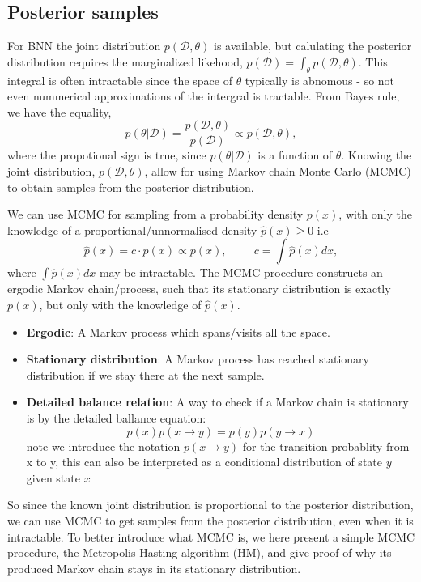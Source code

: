 \subsection*{Posterior samples}
For BNN the joint distribution $p(\mathcal{D},\theta)$ is available, but calulating the posterior
distribution requires the marginalized likehood, $p(\mathcal{D}) = \int_{\theta}
p(\mathcal{D},\theta)$. This integral is often intractable since the space of $\theta$ typically is
abnomous - so not even nummerical approximations of the intergral is tractable. From Bayes rule, we
have the equality, 
$$p(\theta|\mathcal{D}) = \frac{p(\mathcal{D},\theta)}{p(\mathcal{D})} \propto
p(\mathcal{D},\theta),$$ where the propotional sign is true, since $p(\theta|\mathcal{D})$ is a
function of $\theta$. Knowing the joint distribution, $p(\mathcal{D},\theta)$, allow for using Markov
chain Monte Carlo (MCMC) to obtain samples from the posterior distribution.  

\begin{testexample2}
    We can use MCMC for sampling from a probability density $p(x)$, with only the knowledge of a 
    proportional/unnormalised density $\hat p(x) \geq 0$ i.e
    $$\hat p(x) = c\cdot p(x) \propto p(x), \hspace{1cm} c = \int \hat p(x) dx,$$ where $\int \hat
    p(x) dx$ may be intractable. The MCMC procedure constructs an ergodic Markov
    chain/process, such that its stationary distribution is exactly $p(x)$, but only
    with the knowledge of $\hat p(x)$. 
    \begin{itemize}[noitemsep]
        \item \textbf{Ergodic}: A Markov process which spans/visits all the space. 
        \item \textbf{Stationary distribution}: A Markov process has reached stationary distribution if
                            we stay there at the next sample. 
        \item \textbf{Detailed balance relation}: A way to check if a Markov chain is
        stationary is by the detailed ballance equation: $$p(x)p(x\rightarrow y) =
        p(y)p(y\rightarrow x)$$ note we introduce the notation $p(x\rightarrow y)$ for the
        transition probablity from x to y, this can also be interpreted as a conditional
        distribution of state $y$ given state $x$  
    \end{itemize}
\end{testexample2}
So since the known joint distribution is proportional to the posterior distribution, we can use MCMC
to get samples from the posterior distribution, even when it is intractable. To better introduce
what MCMC is, we here present a simple MCMC procedure, the Metropolis-Hasting algorithm (HM), and
give proof of why its produced Markov chain stays in its stationary distribution.

